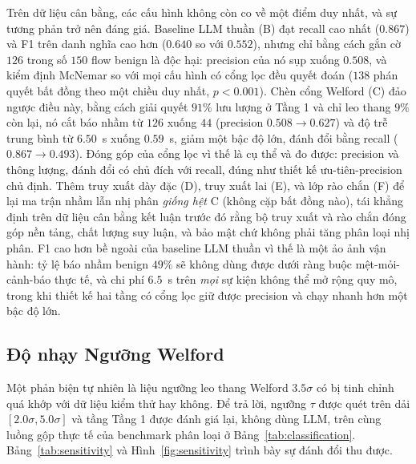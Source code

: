 Trên dữ liệu cân bằng, các cấu hình không còn co về một điểm duy nhất, và sự tương phản trở nên đáng giá. Baseline LLM thuần (B) đạt recall cao nhất ($0.867$) và F1 trên danh nghĩa cao hơn ($0.640$ so với $0.552$), nhưng chỉ bằng cách gắn cờ $126$ trong số $150$ flow benign là độc hại: precision của nó sụp xuống $0.508$, và kiểm định McNemar so với mọi cấu hình có cổng lọc đều quyết đoán ($138$ phán quyết bất đồng theo một chiều duy nhất, $p < 0.001$). Chèn cổng Welford (C) đảo ngược điều này, bằng cách giải quyết $91\%$ lưu lượng ở Tầng 1 và chỉ leo thang $9\%$ còn lại, nó cắt báo nhầm từ $126$ xuống $44$ (precision $0.508 \rightarrow 0.627$) và độ trễ trung bình từ $6.50$~s xuống $0.59$~s, giảm một bậc độ lớn, đánh đổi bằng recall ($0.867 \rightarrow 0.493$). Đóng góp của cổng lọc vì thế là cụ thể và đo được: precision và thông lượng, đánh đổi có chủ đích với recall, đúng như thiết kế ưu-tiên-precision chủ định. Thêm truy xuất dày đặc (D), truy xuất lai (E), và lớp rào chắn (F) để lại ma trận nhầm lẫn nhị phân \emph{giống hệt} C (không cặp bất đồng nào), tái khẳng định trên dữ liệu cân bằng kết luận trước đó rằng bộ truy xuất và rào chắn đóng góp nền tảng, chất lượng suy luận, và bảo mật chứ không phải tăng phân loại nhị phân. F1 cao hơn bề ngoài của baseline LLM thuần vì thế là một ảo ảnh vận hành: tỷ lệ báo nhầm benign $49\%$ sẽ không dùng được dưới ràng buộc mệt-mỏi-cảnh-báo thực tế, và chi phí $6.5$~s trên \emph{mọi} sự kiện không thể mở rộng quy mô, trong khi thiết kế hai tầng có cổng lọc giữ được precision và chạy nhanh hơn một bậc độ lớn.

\subsection{Độ nhạy Ngưỡng Welford}
Một phản biện tự nhiên là liệu ngưỡng leo thang Welford $3.5\sigma$ có bị tinh chỉnh quá khớp với dữ liệu kiểm thử hay không. Để trả lời, ngưỡng $\tau$ được quét trên dải $[2.0\sigma, 5.0\sigma]$ và tầng Tầng 1 được đánh giá lại, không dùng LLM, trên cùng luồng gộp thực tế của benchmark phân loại ở Bảng~\ref{tab:classification}. Bảng~\ref{tab:sensitivity} và Hình~\ref{fig:sensitivity} trình bày sự đánh đổi thu được.

